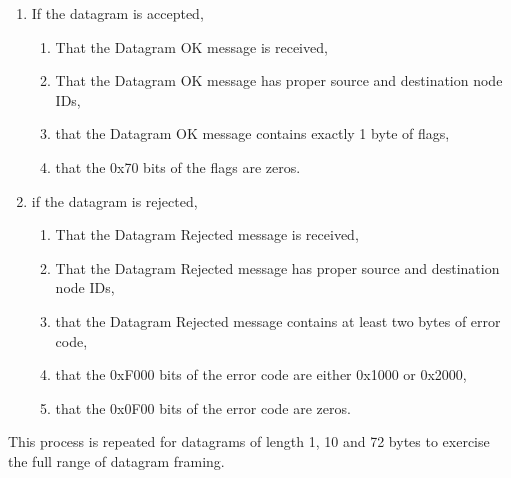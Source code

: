 \documentclass[11pt]{article}
\begin{document}
\begin{enumerate}
\item If the datagram is accepted,
    \begin{enumerate}
    \item That the Datagram OK message is received,
    \item That the Datagram OK message has proper source and destination node IDs, 
    \item that the Datagram OK message contains exactly 1 byte of flags,
    \item that the 0x70 bits of the flags are zeros.
    \end{enumerate}
\item if the datagram is rejected, 
    \begin{enumerate}
    \item That the Datagram Rejected message is received,
    \item That the Datagram Rejected message has proper source and destination node IDs, 
    \item that the Datagram Rejected message contains at least two bytes of error code,
    \item that the 0xF000 bits of the error code are either 0x1000 or 0x2000,
    \item that the 0x0F00 bits of the error code are zeros.
    \end{enumerate}
\end{enumerate}

This process is repeated for datagrams of length 1, 10 and 72 bytes to exercise the full
range of datagram framing.
\end{document}
